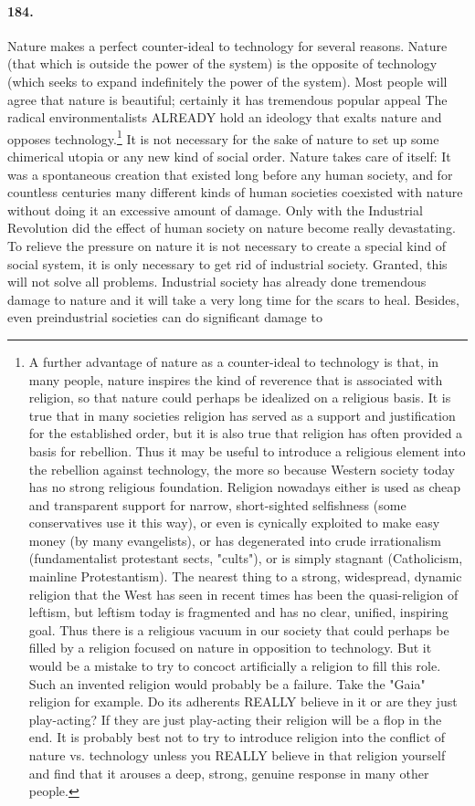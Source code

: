 \documentclass[12pt]{book}
\begin{document}
\paragraph{184.} Nature makes a perfect counter-ideal to technology for several reasons. Nature (that which is outside the power of the system) is the opposite of technology (which seeks to expand indefinitely the power of the system). Most people will agree that nature is beautiful; certainly it has tremendous popular appeal The radical environmentalists ALREADY hold an ideology that exalts nature and opposes technology.\footnote{A further advantage of nature as a counter-ideal to technology is that, in many people, nature inspires the kind of reverence that is associated with religion, so that nature could perhaps be idealized on a religious basis. It is true that in many societies religion has served as a support and justification for the established order, but it is also true that religion has often provided a basis for rebellion. Thus it may be useful to introduce a religious element into the rebellion against technology, the more so because Western society today has no strong religious foundation. Religion nowadays either is used as cheap and transparent support for narrow, short-sighted selfishness (some conservatives use it this way), or even is cynically exploited to make easy money (by many evangelists), or has degenerated into crude irrationalism (fundamentalist protestant sects, "cults"), or is simply stagnant (Catholicism, mainline Protestantism). The nearest thing to a strong, widespread, dynamic religion that the West has seen in recent times has been the quasi-religion of leftism, but leftism today is fragmented and has no clear, unified, inspiring goal. Thus there is a religious vacuum in our society that could perhaps be filled by a religion focused on nature in opposition to technology. But it would be a mistake to try to concoct artificially a religion to fill this role. Such an invented religion would probably be a failure. Take the "Gaia" religion for example. Do its adherents REALLY believe in it or are they just play-acting? If they are just play-acting their religion will be a flop in the end. It is probably best not to try to introduce religion into the conflict of nature vs. technology unless you REALLY believe in that religion yourself and find that it arouses a deep, strong, genuine response in many other people.} It is not necessary for the sake of nature to set up some chimerical utopia or any new kind of social order. Nature takes care of itself: It was a spontaneous creation that existed long before any human society, and for countless centuries many different kinds of human societies coexisted with nature without doing it an excessive amount of damage. Only with the Industrial Revolution did the effect of human society on nature become really devastating. To relieve the pressure on nature it is not necessary to create a special kind of social system, it is only necessary to get rid of industrial society. Granted, this will not solve all problems. Industrial society has already done tremendous damage to nature and it will take a very long time for the scars to heal. Besides, even preindustrial societies can do significant damage to 
\end{document}

